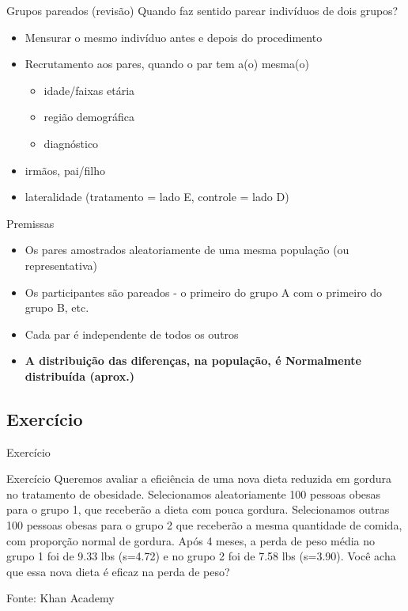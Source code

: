 \documentclass{beamer}
\begin{document}
\begin{frame}{Grupos pareados (revisão)}
Quando faz sentido parear indivíduos de dois grupos?
  \begin{itemize}
  \item Mensurar o \alert{mesmo} indivíduo antes e depois do procedimento
  \item Recrutamento aos pares, quando o par tem a(o) mesma(o)
    \begin{itemize}
    \item idade/faixas etária
    \item região demográfica
    \item diagnóstico
    \end{itemize}
  \item irmãos, pai/filho
  \item lateralidade (tratamento = lado E, controle = lado D)
  \end{itemize}
\end{frame}

\begin{frame}{Premissas}
  \begin{itemize}
  \item Os pares amostrados aleatoriamente de uma mesma população (ou representativa)
  \item Os participantes são pareados - o primeiro do grupo A com o primeiro do grupo B, etc.
  \item Cada par é independente de todos os outros
  \item {\bf A distribuição das diferenças, na população, é Normalmente distribuída (aprox.)}
  \end{itemize}
\end{frame}

\subsection{Exercício}

\begin{frame}{Exercício}
  \begin{exampleblock}{Exercício}
    Queremos avaliar a eficiência de uma nova dieta reduzida em
    gordura no tratamento de obesidade. Selecionamos aleatoriamente
    100 pessoas obesas para o grupo 1, que receberão a dieta com pouca
    gordura. Selecionamos outras 100 pessoas obesas para o grupo 2 que
    receberão a mesma quantidade de comida, com proporção normal de
    gordura. Após 4 meses, a perda de peso média no grupo 1 foi de
    9.33 lbs (s=4.72) e no grupo 2 foi de 7.58 lbs (s=3.90). Você acha
    que essa nova dieta é eficaz na perda de peso?
  \end{exampleblock}
  Fonte: Khan Academy
\end{frame}
\end{document}
